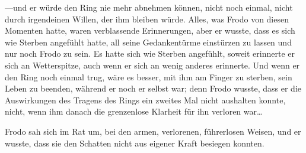 —und er würde den Ring nie mehr abnehmen können, nicht noch einmal, nicht durch irgendeinen Willen, der ihm bleiben würde. Alles, was Frodo von diesen Momenten hatte, waren verblassende Erinnerungen, aber er wusste, dass es sich wie Sterben angefühlt hatte, all seine Gedankentürme einstürzen zu lassen und nur noch Frodo zu sein. Es hatte sich wie Sterben angefühlt, soweit erinnerte er sich an Wetterspitze, auch wenn er sich an wenig anderes erinnerte. Und wenn er den Ring noch einmal trug, wäre es besser, mit ihm am Finger zu sterben, sein Leben zu beenden, während er noch er selbst war; denn Frodo wusste, dass er die Auswirkungen des Tragens des Rings ein zweites Mal nicht aushalten konnte, nicht, wenn ihm danach die grenzenlose Klarheit für ihn verloren war…

Frodo sah sich im Rat um, bei den armen, verlorenen, führerlosen Weisen, und er wusste, dass sie den Schatten nicht aus eigener Kraft besiegen konnten.


